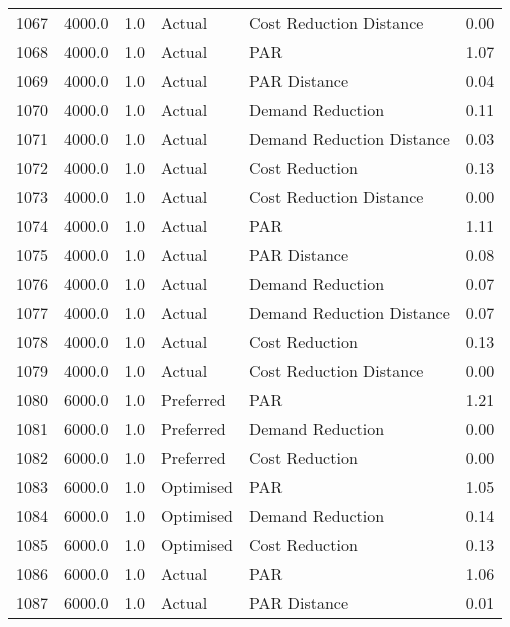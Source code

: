 \begin{longtable}{lrrllr}
1067 &       4000.0 &     1.0 &         Actual &    Cost Reduction Distance &   0.00 \\
1068 &       4000.0 &     1.0 &         Actual &                        PAR &   1.07 \\
1069 &       4000.0 &     1.0 &         Actual &               PAR Distance &   0.04 \\
1070 &       4000.0 &     1.0 &         Actual &           Demand Reduction &   0.11 \\
1071 &       4000.0 &     1.0 &         Actual &  Demand Reduction Distance &   0.03 \\
1072 &       4000.0 &     1.0 &         Actual &             Cost Reduction &   0.13 \\
1073 &       4000.0 &     1.0 &         Actual &    Cost Reduction Distance &   0.00 \\
1074 &       4000.0 &     1.0 &         Actual &                        PAR &   1.11 \\
1075 &       4000.0 &     1.0 &         Actual &               PAR Distance &   0.08 \\
1076 &       4000.0 &     1.0 &         Actual &           Demand Reduction &   0.07 \\
1077 &       4000.0 &     1.0 &         Actual &  Demand Reduction Distance &   0.07 \\
1078 &       4000.0 &     1.0 &         Actual &             Cost Reduction &   0.13 \\
1079 &       4000.0 &     1.0 &         Actual &    Cost Reduction Distance &   0.00 \\
1080 &       6000.0 &     1.0 &      Preferred &                        PAR &   1.21 \\
1081 &       6000.0 &     1.0 &      Preferred &           Demand Reduction &   0.00 \\
1082 &       6000.0 &     1.0 &      Preferred &             Cost Reduction &   0.00 \\
1083 &       6000.0 &     1.0 &      Optimised &                        PAR &   1.05 \\
1084 &       6000.0 &     1.0 &      Optimised &           Demand Reduction &   0.14 \\
1085 &       6000.0 &     1.0 &      Optimised &             Cost Reduction &   0.13 \\
1086 &       6000.0 &     1.0 &         Actual &                        PAR &   1.06 \\
1087 &       6000.0 &     1.0 &         Actual &               PAR Distance &   0.01 \\

\end{longtable}
